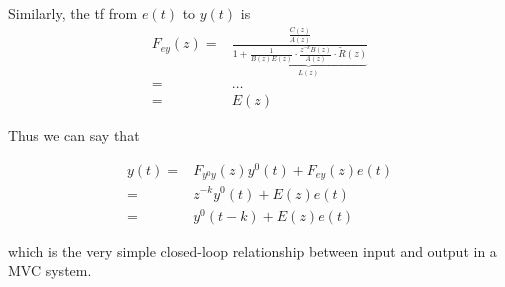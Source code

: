 Similarly, the \gls{tf} from $e(t)$ to $y(t)$ is 
\begin{align*}
	F_{ey}(z) =& \frac{\frac{C(z)}{A(z)}}{1 + \underbrace{\frac{1}{B(z)E(z)}\cdot \frac{z^{-k}B(z)}{A(z)}\cdot\tilde{R}(z)}_{L(z)}} \\
	=& \dots \\
	=& E(z)
\end{align*}

Thus we can say that

\begin{align*}
	y(t) =& F_{y^0y}(z) y^0(t) + F_{ey}(z) e(t) \\
		 =& z^{-k} y^0(t) + E(z) e(t) \\
         =& y^0(t-k) + E(z) e(t)
\end{align*}
 
which is the very simple closed-loop relationship between input and output in a MVC system.


